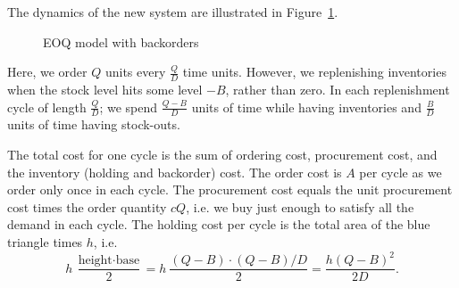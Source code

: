 \begin{solution}
The dynamics of the new system are illustrated in Figure~\ref{fig:EOQ_backorders}. 

\begin{figure}[htbp]
\centering
{}  
\caption{EOQ model with backorders}
\label{fig:EOQ_backorders}
\end{figure}


Here, we order $Q$ units every $\frac{Q}{D}$ time units. However, we replenishing inventories when the stock level hits some level $-B$, rather than zero. In each replenishment cycle of length $\frac{Q}{D}$; we spend $\frac{Q-B}{D}$ units of time while having inventories and $\frac{B}{D}$ units of time having stock-outs. 



The total cost for one cycle is the sum of ordering cost, procurement cost, and the inventory (holding and backorder) cost. The order cost is $A$ per cycle as we order only once in each cycle. The procurement cost equals the unit procurement cost times the order quantity $cQ$, i.e. we buy just enough to satisfy all the demand in each cycle. The holding cost per cycle is the total area of the blue triangle times $h$, i.e. 
\begin{equation*}
h~\frac{\text{height}\cdot\text{base}}{2} = h~\frac{(Q-B) \cdot (Q-B)/D}{2} = \frac{h(Q-B)^2}{2D}.
\end{equation*}


\end{solution}
